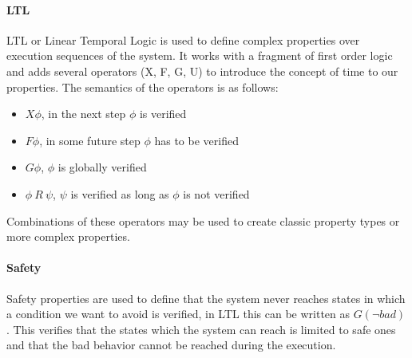 \paragraph*{LTL} LTL or Linear Temporal Logic is used to define complex properties over execution sequences of the system.
It works with a fragment of first order logic and adds several operators (X, F, G, U) to introduce the concept of time to our properties.
The semantics of the operators is as follows:
\begin{itemize}
    \item \begin{math} X \phi \end{math}, in the next step \begin{math} \phi \end{math} is verified
    \item \begin{math} F \phi \end{math}, in some future step \begin{math} \phi \end{math} has to be verified
    \item \begin{math} G \phi \end{math}, \begin{math} \phi \end{math} is globally verified
    \item \begin{math} \phi\ R\ \psi \end{math}, \begin{math} \psi \end{math} is verified as long as \begin{math} \phi \end{math} is not verified
\end{itemize}

Combinations of these operators may be used to create classic property types or more complex properties.

\paragraph*{Safety} Safety properties are used to define that the system never reaches states in which a condition we want to avoid is verified, in LTL this can be written as \begin{math}G (\lnot bad)\end{math}.
This verifies that the states which the system can reach is limited to safe ones and that the bad behavior cannot be reached during the execution.

